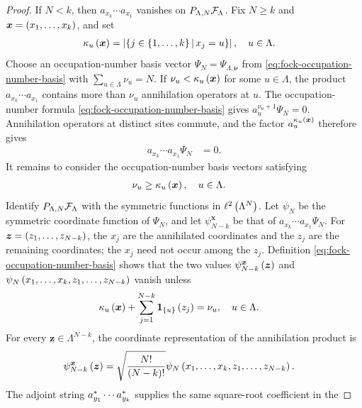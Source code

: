 \documentclass[11pt,a4paper]{article}
\theoremstyle{plain}
\theoremstyle{definition}
\theoremstyle{remark}
\begin{document}
\begin{proof}
If $N<k$, then $a_{x_k}\cdots a_{x_1}$ vanishes on
$P_{\Lambda,N}\sphilb{F}_{\Lambda}$.
Fix $N\geq k$ and $\boldsymbol{x}=\left( x_1,\ldots,x_k \right)$, and set
$$\begin{aligned}
\kappa_u \left( \boldsymbol{x} \right)
& =
\left| \left\{j\in\left\{ 1,\ldots,k \right\} \, \middle| \, x_j=u\right\} \right|,
\quad u\in\Lambda.
\end{aligned}$$
Choose an occupation-number basis vector $\Psi_N=\Psi_{\Lambda,\boldsymbol{\nu}}$ from
\eqref{eq:fock-occupation-number-basis} with $\sum_{u\in\Lambda}\nu_u=N$.
If $\nu_u<\kappa_u \left( \boldsymbol{x} \right)$ for some $u\in\Lambda$, the product
$a_{x_k}\cdots a_{x_1}$ contains more than $\nu_u$ annihilation operators at $u$.
The occupation-number formula \eqref{eq:fock-occupation-number-basis} gives
$a_u^{\nu_u+1}\Psi_N=0$.
Annihilation operators at distinct sites commute, and the factor $a_u^{\kappa_u \left( \boldsymbol{x} \right)}$
therefore gives
$$\begin{aligned}
a_{x_k}\cdots a_{x_1}\Psi_N
& =
0.
\end{aligned}$$
It remains to consider the occupation-number basis vectors satisfying
$$\begin{aligned}
\nu_u
& \geq
\kappa_u \left( \boldsymbol{x} \right),
\quad u\in\Lambda.
\end{aligned}$$
Identify $P_{\Lambda,N}\sphilb{F}_{\Lambda}$ with the symmetric functions in
$\ell^2\left( \Lambda^N \right)$.
Let $\psi_N$ be the symmetric coordinate function of $\Psi_N$, and let
$\psi_{N-k}^{\boldsymbol{x}}$ be that of $a_{x_k}\cdots a_{x_1}\Psi_N$.
For $\boldsymbol{z}=\left( z_1,\ldots,z_{N-k} \right)$, the $x_j$ are the annihilated coordinates and the $z_j$ are
the remaining coordinates; the $x_j$ need not occur among the $z_j$.
Definition \eqref{eq:fock-occupation-number-basis} shows that the two values
$\psi_{N-k}^{\boldsymbol{x}} \left( \boldsymbol{z} \right)$ and
$\psi_N \left( x_1,\ldots,x_k,z_1,\ldots,z_{N-k} \right)$ vanish unless
$$\begin{aligned}
\kappa_u \left( \boldsymbol{x} \right)
+
\sum_{j=1}^{N-k}\boldsymbol{1}_{\left\{ u \right\}} \left( z_j \right)
& =
\nu_u,
\quad u\in\Lambda.
\end{aligned}$$
For every $\boldsymbol{z}\in\Lambda^{N-k}$, the coordinate representation of the annihilation product is
$$\begin{aligned}
\psi_{N-k}^{\boldsymbol{x}} \left( \boldsymbol{z} \right)
& =
\sqrt{\frac{N!}{\left( N-k \right)!}}
\psi_N \left( x_1,\ldots,x_k,z_1,\ldots,z_{N-k} \right).
\end{aligned}$$
The adjoint string $a_{y_1}^{\ast}\cdots a_{y_k}^{\ast}$ supplies the same square-root coefficient in the

\end{proof}
\end{document}
